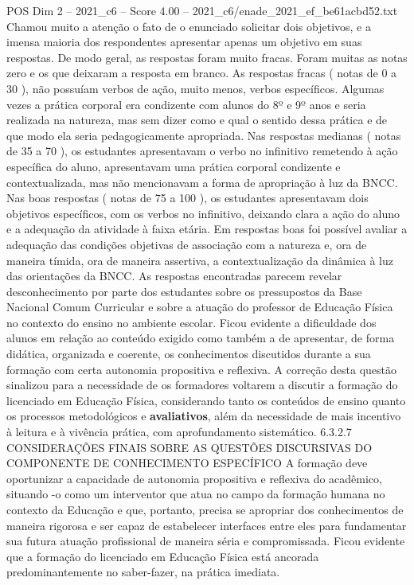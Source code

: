 \begin{textsample}{POS Dim 2 – 2021\_c6 – Score 4.00 – 2021\_c6/enade\_2021\_ef\_be61acbd52.txt}
Chamou muito a atenção o fato de o enunciado solicitar dois objetivos, e a imensa maioria dos respondentes apresentar apenas um objetivo em suas respostas.
De modo geral, as respostas foram muito fracas.
Foram muitas as notas zero e os que deixaram a resposta em branco.
As respostas fracas ( notas de 0 a 30 ), não possuíam verbos de ação, muito menos, verbos específicos.
Algumas vezes a prática corporal era condizente com alunos do 8º e 9º anos e seria realizada na natureza, mas sem dizer como e qual o sentido dessa prática e de que modo ela seria pedagogicamente apropriada.
Nas respostas medianas ( notas de 35 a 70 ), os estudantes apresentavam o verbo no infinitivo remetendo à ação específica do aluno, apresentavam uma prática corporal condizente e contextualizada, mas não mencionavam a forma de apropriação à luz da BNCC.
Nas boas respostas ( notas de 75 a 100 ), os estudantes apresentavam dois objetivos específicos, com os verbos no infinitivo, deixando clara a ação do aluno e a adequação da atividade à faixa etária.
Em respostas boas foi possível avaliar a adequação das condições objetivas de associação com a natureza e, ora de maneira tímida, ora de maneira assertiva, a contextualização da dinâmica à luz das orientações da BNCC.
As respostas encontradas parecem revelar desconhecimento por parte dos estudantes sobre os pressupostos da Base Nacional Comum Curricular e sobre a atuação do professor de Educação Física no contexto do ensino no ambiente escolar.
Ficou evidente a dificuldade dos alunos em relação ao conteúdo exigido como também a de apresentar, de forma didática, organizada e coerente, os conhecimentos discutidos durante a sua formação com certa autonomia propositiva e reflexiva.
A correção desta questão sinalizou para a necessidade de os formadores voltarem a discutir a formação do licenciado em Educação Física, considerando tanto os conteúdos de ensino quanto os processos metodológicos e \textbf{avaliativos}, além da necessidade de mais incentivo à leitura e à vivência prática, com aprofundamento sistemático. 6.3.2.7 CONSIDERAÇÕES FINAIS SOBRE AS QUESTÕES DISCURSIVAS DO COMPONENTE DE CONHECIMENTO ESPECÍFICO A formação deve oportunizar a capacidade de autonomia propositiva e reflexiva do acadêmico, situando -o como um interventor que atua no campo da formação humana no contexto da Educação e que, portanto, precisa se apropriar dos conhecimentos de maneira rigorosa e ser capaz de estabelecer interfaces entre eles para fundamentar sua futura atuação profissional de maneira séria e compromissada.
Ficou evidente que a formação do licenciado em Educação Física está ancorada predominantemente no saber-fazer, na prática imediata.

\end{textsample}
